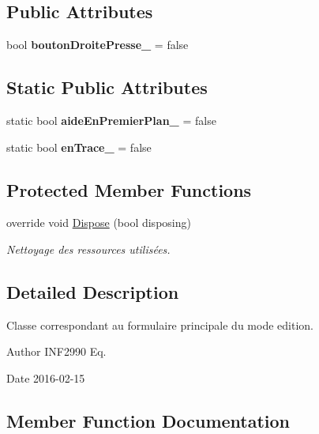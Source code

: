 \subsection*{Public Attributes}
\begin{DoxyCompactItemize}
\item 
bool {\bfseries bouton\+Droite\+Presse\+\_\+} = false
\end{DoxyCompactItemize}
\subsection*{Static Public Attributes}
\begin{DoxyCompactItemize}
\item 
static bool {\bfseries aide\+En\+Premier\+Plan\+\_\+} = false
\item 
static bool {\bfseries en\+Trace\+\_\+} = false
\end{DoxyCompactItemize}
\subsection*{Protected Member Functions}
\begin{DoxyCompactItemize}
\item 
override void \hyperlink{class_interface_graphique_1_1_edition_ad3404dbef381fe04da6db94114d6bcc0}{Dispose} (bool disposing)
\begin{DoxyCompactList}\small\item\em Nettoyage des ressources utilisées. \end{DoxyCompactList}\end{DoxyCompactItemize}


\subsection{Detailed Description}
Classe correspondant au formulaire principale du mode edition. 

\begin{DoxyAuthor}{Author}
I\+N\+F2990 Eq. 
\end{DoxyAuthor}
\begin{DoxyDate}{Date}
2016-\/02-\/15 
\end{DoxyDate}


\subsection{Member Function Documentation}
